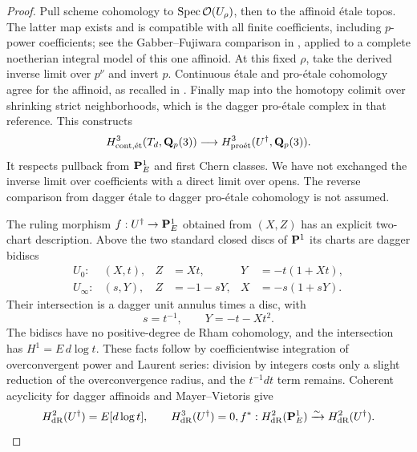 \begin{proof}
Pull scheme cohomology to $\operatorname{Spec}\mathcal O(U_\rho)$, then to the affinoid \'etale topos. The latter map exists and is compatible with all finite coefficients, including $p$-power coefficients; see the Gabber--Fujiwara comparison in \cite[Theorem~6.2.1]{Achinger}, applied to a complete noetherian integral model of this one affinoid. At this fixed $\rho$, take the derived inverse limit over $p^\nu$ and invert $p$. Continuous \'etale and pro-\'etale cohomology agree for the affinoid, as recalled in \cite[Section~3.2.3]{ColmezNiziol}. Finally map into the homotopy colimit over shrinking strict neighborhoods, which is the dagger pro-\'etale complex in that reference. This constructs
\begin{equation}\label{d3:eq:schemetodagger}
H^3_{\mathrm{cont},\mathrm{\acute et}}(T_d,\mathbf Q_p(3))
\longrightarrow H^3_{\mathrm{pro\acute et}}(U^\dagger,\mathbf Q_p(3)).
\end{equation}
It respects pullback from $\mathbf P^1_E$ and first Chern classes. We have not exchanged the inverse limit over coefficients with a direct limit over opens. The reverse comparison from dagger \'etale to dagger pro-\'etale cohomology is not assumed.

The ruling morphism $f:U^\dagger\to\mathbf P^1_E$ obtained from $(X,Z)$ has an explicit two-chart description. Above the two standard closed discs of $\mathbf P^1$ its charts are dagger bidiscs
\begin{align*}
U_0: &(X,t),&Z&=Xt,&Y&=-t(1+Xt),\\
U_\infty: &(s,Y),&Z&=-1-sY,&X&=-s(1+sY).
\end{align*}
Their intersection is a dagger unit annulus times a disc, with
\[
s=t^{-1},\qquad Y=-t-Xt^2.
\]
The bidiscs have no positive-degree de Rham cohomology, and the intersection has $H^1=E\,d\log t$. These facts follow by coefficientwise integration of overconvergent power and Laurent series: division by integers costs only a slight reduction of the overconvergence radius, and the $t^{-1}dt$ term remains. Coherent acyclicity for dagger affinoids \cite[Proposition~3.1]{GrosseKlonne} and Mayer--Vietoris give
\[
H^2_{\mathrm{dR}}(U^\dagger)=E[d\log t],\qquad H^3_{\mathrm{dR}}(U^\dagger)=0,
f^*:H^2_{\mathrm{dR}}(\mathbf P^1_E)\xrightarrow{\sim}H^2_{\mathrm{dR}}(U^\dagger).
\]


\end{proof}
